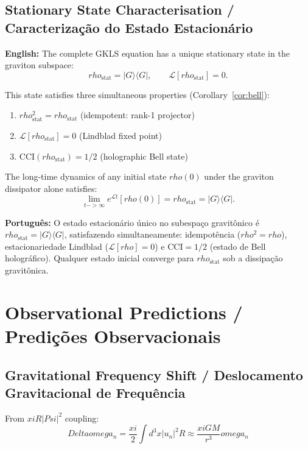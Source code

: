 \documentclass[12pt,a4paper]{article}
\def\Psi{Psi}%
\def\to{ -> }%
\def\xi{xi}%
\def\rho{rho}%
\def\omega{omega}%
\def\Delta{Delta}%
\begin{document}
\subsection{Stationary State Characterisation / Caracterização do Estado Estacionário}

\textbf{English:} The complete GKLS equation has a unique stationary state in the graviton subspace:
\begin{equation}
\rho_{\mathrm{stat}} = |G\rangle\langle G|, \qquad \mathcal{L}[\rho_{\mathrm{stat}}] = 0.
\end{equation}

This state satisfies three simultaneous properties (Corollary~\ref{cor:bell}):
\begin{enumerate}
    \item $\rho_{\mathrm{stat}}^2 = \rho_{\mathrm{stat}}$ (idempotent: rank-1 projector)
    \item $\mathcal{L}[\rho_{\mathrm{stat}}] = 0$ (Lindblad fixed point)
    \item $\mathrm{CCI}(\rho_{\mathrm{stat}}) = 1/2$ (holographic Bell state)
\end{enumerate}

The long-time dynamics of any initial state $\rho(0)$ under the graviton dissipator alone satisfies:
\begin{equation}
\lim_{t\to\infty} e^{\mathcal{L}t}[\rho(0)] = \rho_{\mathrm{stat}} = |G\rangle\langle G|.
\end{equation}

\textbf{Português:} O estado estacionário único no subespaço gravitônico é $\rho_{\text{stat}} = |G\rangle\langle G|$, satisfazendo simultaneamente: idempotência ($\rho^2=\rho$), estacionariedade Lindblad ($\mathcal{L}[\rho]=0$) e CCI$=1/2$ (estado de Bell holográfico). Qualquer estado inicial converge para $\rho_{\text{stat}}$ sob a dissipação gravitônica.

\section{Observational Predictions / Predições Observacionais}

\subsection{Gravitational Frequency Shift / Deslocamento Gravitacional de Frequência}

From $\xi R|\Psi|^2$ coupling:
\begin{equation}
\Delta\omega_n = \frac{\xi}{2}\int d^3x |u_n|^2 R \approx \frac{\xi GM}{r^3}\omega_n
\end{equation}
\end{document}
